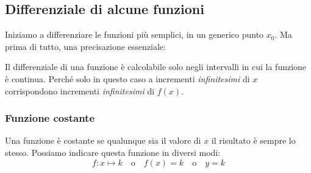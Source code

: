 \begin{comment}
\begin{esempio}
 Calcola $df(x)|_{x=5}$, con $f(x)=x^2$. Calcola poi $df(x)|_{x=-5}$ 
 e infine $df(x)|_{x=2}$.
 \begin{align*} 
  d(x^2)|_{x=5} & 
=(5+\epsilon)^2-5^2=25+10\epsilon+\epsilon^2-25=10\epsilon+\epsilon^2\\
  d(x^2)|_{x=-5}& 
=(-5+\epsilon)^2-(-5)^2=25-10\epsilon+\epsilon^2-25=-10\epsilon+\epsilon^2\\
  d(x^2)|_{x=2} & 
=(2+\epsilon)^2-2^2=4+4\epsilon+\epsilon^2-4=4\epsilon+\epsilon^2\\
 \end{align*}
\end{esempio}


\begin{osservazione}
 Non abbiamo fatto alcuna ipotesi su $\epsilon$. 
 Potrebbe essere un infinitesimo positivo o negativo, 
 potrebbe essere il triplo o il quadrato di un altro infinitesimo. 
 Il risultato non cambia e ha valore per qualsiasi $\epsilon$.
\end{osservazione}

\end{comment}

\subsection{Differenziale di alcune funzioni}
\label{subsec:diff01_difffun}
Iniziamo a differenziare le funzioni più semplici, in un generico punto 
$x_0$.
Ma prima di tutto, una precisazione essenziale:

\begin{osservazione}
 Il differenziale di una funzione è calcolabile solo negli intervalli in cui
 la funzione è continua. 
 Perché solo in questo caso a incrementi \emph{infinitesimi} di $x$ 
 corrispondono incrementi \emph{infinitesimi} di $f(x)$.
\end{osservazione}

\subsubsection{Funzione costante}
\label{subsubsec:diff01_diffcostante}

Una funzione è costante se qualunque sia il valore di $x$ il risultato è 
sempre lo stesso. Possiamo indicare questa funzione in diversi modi:
\[f: x \mapsto k \quad \text{o} \quad f(x)=k \quad \text{o} \quad y = k\]

